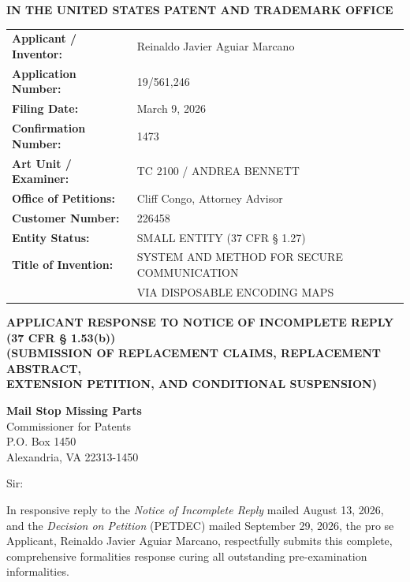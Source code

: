 \documentclass[11pt,letterpaper]{article}
\begin{document}
\thispagestyle{empty}

\begin{center}
    \textbf{\large IN THE UNITED STATES PATENT AND TRADEMARK OFFICE}
\end{center}

\vspace{0.3cm}
\noindent\begin{tabular}{p{2.3in}p{4.0in}}
\textbf{Applicant / Inventor:} & Reinaldo Javier Aguiar Marcano \\
\textbf{Application Number:} & 19/561,246 \\
\textbf{Filing Date:} & March 9, 2026 \\
\textbf{Confirmation Number:} & 1473 \\
\textbf{Art Unit / Examiner:} & TC 2100 / ANDREA BENNETT \\
\textbf{Office of Petitions:} & Cliff Congo, Attorney Advisor \\
\textbf{Customer Number:} & 226458 \\
\textbf{Entity Status:} & SMALL ENTITY (37 CFR \S{} 1.27) \\
\textbf{Title of Invention:} & SYSTEM AND METHOD FOR SECURE COMMUNICATION \\
& VIA DISPOSABLE ENCODING MAPS \\
\end{tabular}

\vspace{0.4cm}
\begin{center}
    \textbf{\large APPLICANT RESPONSE TO NOTICE OF INCOMPLETE REPLY \\
    (37 CFR \S{} 1.53(b))} \\
    \textbf{\normalsize (SUBMISSION OF REPLACEMENT CLAIMS, REPLACEMENT ABSTRACT, \\
    EXTENSION PETITION, AND CONDITIONAL SUSPENSION)}
\end{center}

\noindent\textbf{Mail Stop Missing Parts} \\
Commissioner for Patents \\
P.O. Box 1450 \\
Alexandria, VA 22313-1450

\vspace{0.2cm}
Sir:

In responsive reply to the \textit{Notice of Incomplete Reply} mailed August 13, 2026, and the \textit{Decision on Petition} (PETDEC) mailed September 29, 2026, the pro se Applicant, Reinaldo Javier Aguiar Marcano, respectfully submits this complete, comprehensive formalities response curing all outstanding pre-examination informalities.
\end{document}
